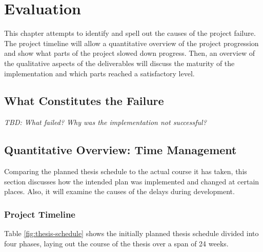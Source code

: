 \chapter{Evaluation}
\label{chap:evaluation}
This chapter attempts to identify and spell out the causes of the project failure. The project timeline will allow a quantitative overview of the project progression and show what parts of the project slowed down progress. Then, an overview of the qualitative aspects of the deliverables will discuss the maturity of the implementation and which parts reached a satisfactory level. %

\section{What Constitutes the Failure}
\emph{TBD: What failed? Why was the implementation not successful?}

\section{Quantitative Overview: Time Management}
\label{sec:pm-time-management}
Comparing the planned thesis schedule to the actual course it has taken, this section discusses how the intended plan was implemented and changed at certain places. Also, it will examine the causes of the delays during development.
\subsection{Project Timeline}
\label{sec:project-timeline}
Table \ref{fig:thesis-schedule} shows the initially planned thesis schedule divided into four phases, laying out the course of the thesis over a span of 24 weeks.

